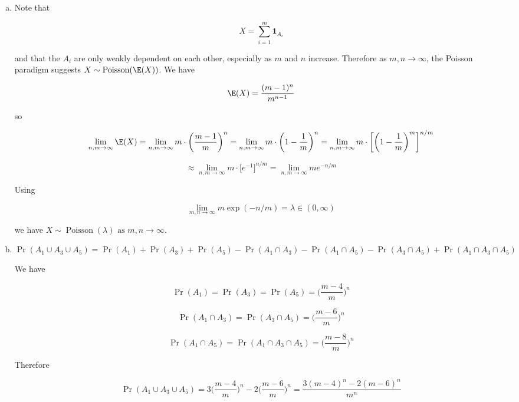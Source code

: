\begin{enumerate}[(a)]
\item Note that 

\[
X = \sum_{i=1}^m \boldsymbol{1}_{A_i}
\]

and that the \(A_i\) are only weakly dependent on each other, especially as \(m\) and \(n\) increase. Therefore as \(m, n \to \infty\), the Poisson paradigm suggests \(X \sim \operatorname{Poisson}(\E(X))\). We have

\[
\E(X) =  \frac{(m-1)^n}{m^{n-1}}
\]

so

\[
\lim_{n, m \to \infty} \E(X) = \lim_{n, m \to \infty} m \cdot \bigg( \frac{m-1}{m}\bigg)^n = \lim_{n, m \to \infty} m \cdot \bigg( 1 - \frac{1}{m}\bigg)^n = \lim_{n, m \to \infty} m \cdot \bigg[\bigg( 1 - \frac{1}{m}\bigg)^m\bigg]^{n/m}
\]

\[
\approx \lim_{n, m \to \infty} m \cdot \big[e^{-1}\big]^{n/m} = \lim_{n, m \to \infty} m e^{-n/m}
\]



%
%


Using

\[
\lim_{m, n \to \infty} m \exp(-n/m) = \lambda \in (0, \infty)
\]

we have \( \boxed{ X  \sim \operatorname{Poisson}(\lambda) \text{ as } m,n \to \infty }\).

\item


\[
\Pr(A_1 \cup A_3 \cup A_5) = \Pr(A_1) + \Pr(A_3) + \Pr(A_5) - \Pr(A_1 \cap A_3) - \Pr(A_1 \cap A_5) - \Pr( A_3 \cap A_5) + \Pr(A_1 \cap A_3 \cap A_5)
\]

We have

\[
\Pr(A_1) = \Pr(A_3) = \Pr(A_5) = \bigg(  \frac{m-4}{m} \bigg)^n
\]

\[
 \Pr(A_1 \cap A_3) = \Pr( A_3 \cap A_5) =  \bigg(  \frac{m-6}{m} \bigg)^n
\]

\[
\Pr(A_1 \cap A_5) = \Pr(A_1 \cap A_3 \cap A_5) = \bigg(  \frac{m-8}{m} \bigg)^n
\]

Therefore

\[
\Pr(A_1 \cup A_3 \cup A_5) = 3\bigg(  \frac{m-4}{m} \bigg)^n -  2 \bigg(  \frac{m-6}{m} \bigg)^n  = \boxed{ \frac{3(m-4)^n - 2(m-6)^n}{m^n}}
\]


\end{enumerate}
